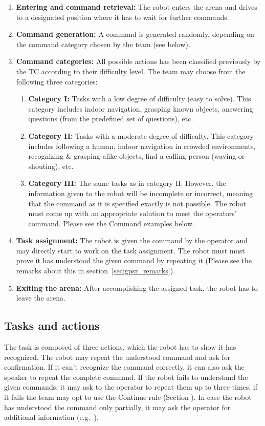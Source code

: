 \begin{enumerate}
	\item \textbf{Entering and command retrieval:} The robot enters the arena and drives to a designated position where it has to wait for further commands.
	\item \textbf{Command generation:} A command is generated randomly, depending on the command category chosen by the team (see below). \\

	\item \textbf{Command categories:} All possible actions has been classified previously by the TC according to their difficulty level. The team may choose from the following three categories:
	\begin{enumerate}
		\item \textbf{Category I:} Tasks with a low degree of difficulty (easy to solve). This category includes indoor navigation, grasping known objects, answering questions (from the predefined set of questions), etc.
		\item \textbf{Category II:} Tasks with a moderate degree of difficulty. This category includes following a human, indoor navigation in crowded environments, recognizing \& grasping alike objects, find a calling person (waving or shouting), etc.
		\item \textbf{Category III:} The same tasks as in category II. However, the information given to the robot will be incomplete or incorrect, meaning that the command as it is specified exactly is not possible. The robot must come up with an appropriate solution to meet the operators' command. Please see the Command examples below.
	\end{enumerate}

	\item \textbf{Task assignment:} The robot is given the command by the operator and may directly start to work on the task assignment. The robot must must prove it has understood the given command by repeating it (Please see the remarks about this in section~\ref{sec:gpsr_remarks}).
	\item \textbf{Exiting the arena:} After accomplishing the assigned task, the robot has to leave the arena.
\end{enumerate}

\subsection{Tasks and actions}
The task is composed of three actions, which the robot has to show it has recognized. The robot may repeat the understood command and ask for confirmation. If it can't recognize the command correctly, it can also ask the speaker to repeat the complete command. If the robot fails to understand the given commands, it may ask to the operator to repeat them up to three times, if it fails the team may opt to use the Continue rule (Section ). In case the robot has understood the command only partially, it may ask the operator for additional information (e.g.~).

